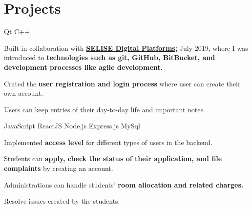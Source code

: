 \documentclass[]{deedy-resume-openfont}
\begin{document}
\hfill
\begin{minipage}[t]{0.57\textwidth} 


\section{Projects}
\linesep

\vspace{2pt}
\textbullet{}Qt \textbullet{} C++\\
\vspace{10pt}
\begin{tightemize}
    \item Built in collaboration with \href{https://selisegroup.com/}{\textbf{SELISE Digital Platforms;}} July 2019, where I was introduced to \textbf{technologies such as git, GitHub, BitBucket, and development processes like agile development.}
    \item Crated the \textbf{user registration and login process} where user can create their own account.
    \item Users can keep entries of their day-to-day life and important notes.
\end{tightemize}
\sectionsep
\vspace{3pt}

\vspace{2pt}
\textbullet{} JavaScript \textbullet{} ReactJS \textbullet{} Node.js\textbullet{} Express.js \textbullet{}MySql\\
\begin{tightemize}
    \item Implemented \textbf{access level} for different types of users in the backend.
    \item Students can \textbf{apply, check the status of their application, and file complaints} by creating an account.
    \item Administrations can handle students' \textbf{room allocation and related charges.}
    \item Resolve issues created by the students.
\end{tightemize}
\sectionsep
\vspace{3pt}


\end{minipage}
\end{document}

